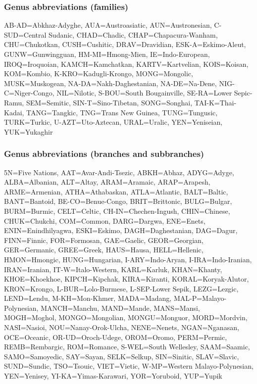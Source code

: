 

\subsubsection{Genus abbreviations (families)}
\begin{flushleft}
AB-AD=Abkhaz-Adyghe, AUA=Austroasiatic, AUN=Austronesian, C-SUD=Central Sudanic, CHAD=Chadic, CHAP=Chapacura-Wanham, CHU=Chukotkan, CUSH=Cushitic, DRAV=Dravidian, ESK-A=Eskimo-Aleut, GUNW=Gunwingguan, HM-MI=Hmong-Mien, IE=Indo-European, IROQ=Iroquoian, KAMCH=Kamchatkan, KARTV=Kartvelian, KOIS=Koisan, KOM=Kombio, K-KRO=Kadugli-Krongo, MONG=Mongolic, MUSK=Muskogean, NA-DA=Nakh-Daghestanian, NA-DE=Na-Dene, NIG-C=Niger-Congo, NIL=Nilotic, S-BOU=South Bougainville, SE-RA=Lower Sepic-Ramu, SEM=Semitic, SIN-T=Sino-Tibetan, SONG=Songhai, TAI-K=Thai-Kadai, TANG=Tangkic, TNG=Trans New Guinea, TUNG=Tungusic, TURK=Turkic, U-AZT=Uto-Aztecan, URAL=Uralic, YEN=Yeniseian, YUK=Yukaghir
\end{flushleft}

\subsubsection{Genus abbreviations (branches and subbranches)}
\begin{flushleft}
5N=Five Nations, AAT=Avar-Andi-Tsezic, ABKH=Abhaz, ADYG=Adyge, ALBA=Albanian, ALT=Altay, ARAM=Aramaic, ARAP=Arapesh, ARME=Armenian, ATHA=Athabaskan, ATLA=Atlantic, BALT=Baltic, BANT=Bantoid, BE-CO=Benue-Congo, BRIT=Brittonic, BULG=Bulgar, BURM=Burmic, CELT=Celtic, CH-IN=Chechen-Ingush, CHIN=Chinese, CHUK=Chukchi, COM=Common, DARG=Dargwa, ENE=Enets, ENIN=Enindhilyagwa, ESKI=Eskimo, DAGH=Daghestanian, DAG=Dagur, FINN=Finnic, FOR=Formosan, GAE=Gaelic, GEOR=Georgian, GER=Germanic, GREE=Greek, HAUS=Hausa, HELL=Hellenic, HMON=Hmongic, HUNG=Hungarian, I-ARY=Indo-Aryan, I-IRA=Indo-Iranian, IRAN=Iranian, IT-W=Italo-Western, KARL=Karluk, KHAN=Khanty, KHOE=Khoekhoe, KIPCH=Kipchak, KIRA=Kiranti, KORAL=Koryak-Alutor, KRON=Krongo, L-BUR=Lolo-Burmese, L-SEP-Lower Sepik, LEZG=Lezgic, LEND=Lendu, M-KH=Mon-Khmer, MADA=Madang, MAL-P=Malayo-Polynesian, MANCH=Manchu, MAND=Mande, MANS=Mansi, MOGH=Moghol, MONGO=Mongolian, MONGU=Monguor, MORD=Mordvin, NASI=Nasioi, NOU=Nanay-Orok-Ulcha, NENE=Nenets, NGAN=Nganasan, OCE=Oceanic, OR-UD=Oroch-Udege, OROM=Oromo, PERM=Permic,  REMB=Rembargic, ROM=Romance, S-WEL=South Wellesley, SAAM=Saamic, SAMO=Samoyedic, SAY=Sayan, SELK=Selkup, SIN=Sinitic, SLAV=Slavic, SUND=Sundic, TSO=Tsouic, VIET=Vietic, W-MP=Western Malayo-Polynesian, YEN=Yenisey, YI-KA=Yimas-Karawari, YOR=Yoruboid, YUP=Yupik
\end{flushleft}

